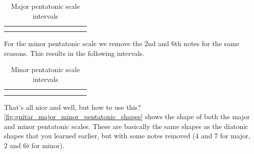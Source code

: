 \begin{table}[h]
	\centering
	\begin{NiceTabular}{*{12}{P{0.05mm}}}
		\Block{}{} &  & &  & &  & &  & &  & & \Block{}{} \\
		 & &  & &  & &  & &  & &  &
	\end{NiceTabular}
	\caption{Major pentatonic scale intervals}
	\label{tab:guitar_major_pentatic_scale}
\end{table}

For the minor pentatonic scale we remove the 2nd and 6th notes for the same reasons. This results in the following intervals.

\begin{table}[h]
	\centering
	\begin{NiceTabular}{*{12}{P{0.05mm}}}
		\Block{}{} &  & &  & &  & &  & &  & & \Block{}{} \\
		 & &  & &  & &  & &  & &  & 
	\end{NiceTabular}
	\caption{Minor pentatonic scale intervals}
	\label{tab:guitar_minor_pentatic_scale}
\end{table}


That's all nice and well, but how to use this? \autoref{fig:guitar_major_minor_pentatonic_shapes} shows the shape of both the major and minor pentatonic scales. These are basically the same shapes as the diatonic shapes that you learned earlier, but with some notes removed (4 and 7 for major, 2 and 6$\flat$ for minor).


